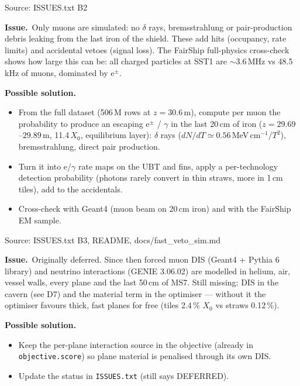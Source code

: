 \documentclass[10pt,a4paper]{article}
\newcommand{\st}[1]{\textbf{#1}}
\newcommand{\stOPEN}{\textcolor{shorange}{\st{OPEN}}}
\newcommand{\stPART}{\textcolor{cernblue}{\st{PARTLY DONE}}}
\newenvironment{issue}[5]{%
  \begin{tcolorbox}[breakable,colback=white,colframe=cernblue,boxrule=0.6pt,arc=1.5mm,
    left=6pt,right=6pt,top=4pt,bottom=4pt,
    title={\textbf{#1}\quad #2\hfill{\normalfont\small priority #3\quad\colorbox{white}{#4}}},
    coltitle=white,colbacktitle=cernblue,fonttitle=\normalsize]
  {\color{greytxt}\footnotesize Source: #5}\par\smallskip}{\end{tcolorbox}\vspace{2pt}}
\newcommand{\prob}{\par\noindent\textbf{\color{cernblue}Issue.}\ }
\newcommand{\sol}{\par\smallskip\noindent\textbf{\color{shorange}Possible solution.}\ }
\begin{document}
\begin{issue}{B2}{EM debris from the end of the shield}{B}{\stOPEN}{ISSUES.txt B2}
\prob Only muons are simulated: no $\delta$ rays, bremsstrahlung or pair-production debris leaking from the last
iron of the shield. These add hits (occupancy, rate limits) and accidental vetoes (signal loss). The FairShip
full-physics cross-check shows how large this can be: all charged particles at SST1 are $\sim3.6$\,MHz vs 48.5\,kHz
of muons, dominated by e$^\pm$.
\sol
\begin{itemize}
\item From the full dataset (506\,M rows at $z=30.6$\,m), compute per muon the probability to produce an
      escaping e$^\pm$ / $\gamma$ in the last 20\,cm of iron ($z=29.69$--$29.89$\,m, 11.4\,$X_0$, equilibrium layer):
      $\delta$ rays ($dN/dT\simeq0.56$\,MeV\,cm$^{-1}/T^2$), bremsstrahlung, direct pair production.
\item Turn it into e/$\gamma$ rate maps on the UBT and fins, apply a per-technology detection probability
      (photons rarely convert in thin straws, more in 1\,cm tiles), add to the accidentals.
\item Cross-check with Geant4 (muon beam on 20\,cm iron) and with the FairShip EM sample.
\end{itemize}
\end{issue}

\begin{issue}{B3}{Neutrino and muon DIS}{B}{\stPART}{ISSUES.txt B3, README, docs/fast\_veto\_sim.md}
\prob Originally deferred. Since then forced muon DIS (Geant4 + Pythia 6 library) and neutrino interactions
(GENIE 3.06.02) are modelled in helium, air, vessel walls, every plane and the last 50\,cm of MS7. Still missing:
DIS in the cavern (see D7) and the material term in the optimiser --- without it the optimiser favours thick, fast
planes for free (tiles 2.4\,\% $X_0$ vs straws 0.12\,\%).
\sol
\begin{itemize}
\item Keep the per-plane interaction source in the objective (already in \texttt{objective.score}) so plane
      material is penalised through its own DIS.
\item Update the status in \texttt{ISSUES.txt} (still says DEFERRED).
\end{itemize}
\end{issue}
\end{document}
